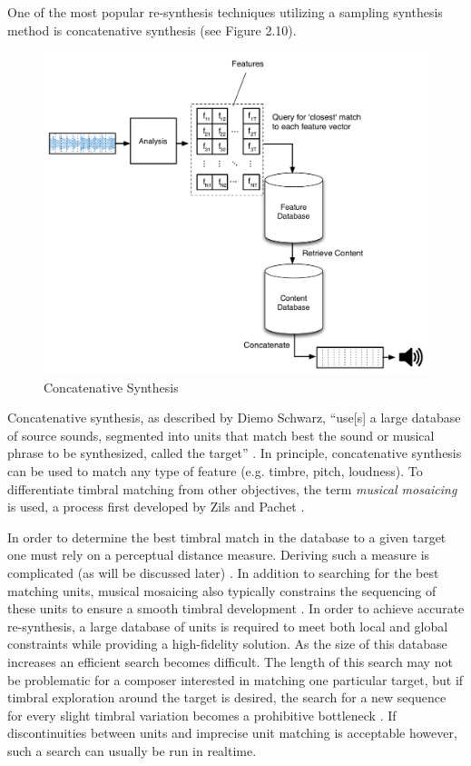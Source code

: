 \documentclass[12pt]{report} 	%
\numberwithin{figure}{chapter}
\numberwithin{table}{chapter}
\numberwithin{equation}{chapter}
\begin{document}
\begin{flushleft}
One of the most popular re-synthesis techniques utilizing a sampling synthesis method is concatenative synthesis (see Figure 2.10). 
\begin{figure}[h!]
\begin{center}
\includegraphics[scale=0.55]{ConcatSynth}
\caption[Concatenative synthesis]{Concatenative Synthesis}
\end{center}
\end{figure}
Concatenative synthesis, as described by Diemo Schwarz, ``use[s] a large database of source sounds, segmented into units that match best the sound or musical phrase to be synthesized, called the target'' \cite[p. 1]{Schwarz:2006gr}. In principle, concatenative synthesis can be used to match any type of feature (e.g. timbre, pitch, loudness). To differentiate timbral matching from other objectives, the term \textit{musical mosaicing} is used, a process first developed by Zils and Pachet \cite{Zils:2001bd}. 

In order to determine the best timbral match in the database to a given target one must rely on a perceptual distance measure. Deriving such a measure is complicated (as will be discussed later) \cite[p. 13]{Schwarz:2006gr}. In addition to searching for the best matching units, musical mosaicing also typically constrains the sequencing of these units to ensure a smooth timbral development \cite[p. 1]{Zils:2001bd}. In order to achieve accurate re-synthesis, a large database of units is required to meet both local and global constraints while providing a high-fidelity solution. As the size of this database increases an efficient search becomes difficult. The length of this search may not be problematic for a composer interested in matching one particular target, but if timbral exploration around the target is desired, the search for a new sequence for every slight timbral variation becomes a prohibitive bottleneck \cite[p. 11]{Schwarz:2006gr}.  If discontinuities between units and imprecise unit matching is acceptable however, such a search can usually be run in realtime.


\end{flushleft}
\end{document}
